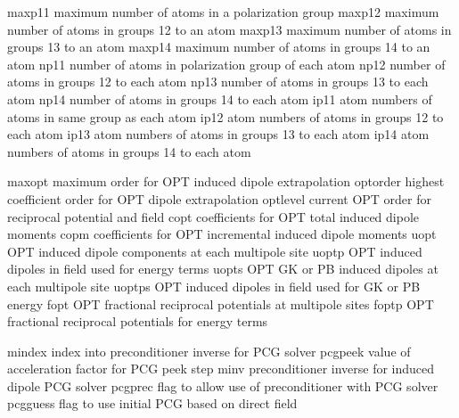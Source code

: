 \documentclass[letterpaper,11pt,english]{sphinxmanual}
\begin{document}

\begin{sphinxVerbatim}[commandchars=\\\{\}]
maxp11          maximum number of atoms in a polarization group
maxp12          maximum number of atoms in groups 1\PYGZhy{}2 to an atom
maxp13          maximum number of atoms in groups 1\PYGZhy{}3 to an atom
maxp14          maximum number of atoms in groups 1\PYGZhy{}4 to an atom
np11            number of atoms in polarization group of each atom
np12            number of atoms in groups 1\PYGZhy{}2 to each atom
np13            number of atoms in groups 1\PYGZhy{}3 to each atom
np14            number of atoms in groups 1\PYGZhy{}4 to each atom
ip11            atom numbers of atoms in same group as each atom
ip12            atom numbers of atoms in groups 1\PYGZhy{}2 to each atom
ip13            atom numbers of atoms in groups 1\PYGZhy{}3 to each atom
ip14            atom numbers of atoms in groups 1\PYGZhy{}4 to each atom
\end{sphinxVerbatim}


\begin{sphinxVerbatim}[commandchars=\\\{\}]
maxopt          maximum order for OPT induced dipole extrapolation
optorder        highest coefficient order for OPT dipole extrapolation
optlevel        current OPT order for reciprocal potential and field
copt            coefficients for OPT total induced dipole moments
copm            coefficients for OPT incremental induced dipole moments
uopt            OPT induced dipole components at each multipole site
uoptp           OPT induced dipoles in field used for energy terms
uopts           OPT GK or PB induced dipoles at each multipole site
uoptps          OPT induced dipoles in field used for GK or PB energy
fopt            OPT fractional reciprocal potentials at multipole sites
foptp           OPT fractional reciprocal potentials for energy terms
\end{sphinxVerbatim}


\begin{sphinxVerbatim}[commandchars=\\\{\}]
mindex          index into preconditioner inverse for PCG solver
pcgpeek         value of acceleration factor for PCG peek step
minv            preconditioner inverse for induced dipole PCG solver
pcgprec         flag to allow use of preconditioner with PCG solver
pcgguess        flag to use initial PCG based on direct field
\end{sphinxVerbatim}
\end{document}
